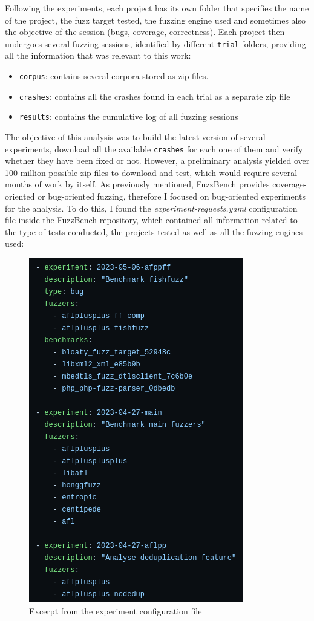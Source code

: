 Following the experiments, each project has its own folder that specifies the name of the project, the fuzz target tested, the fuzzing engine used and sometimes also the objective of the session (bugs, coverage, correctness). Each project then undergoes several fuzzing sessions, identified by different \verb|trial| folders, providing all the information that was relevant to this work:
\begin{itemize}
    \item \verb|corpus|: contains several corpora stored as zip files.
    \item \verb|crashes|: contains all the crashes found in each trial as a separate zip file
    \item \verb|results|: contains the cumulative log of all fuzzing sessions
\end{itemize}


The objective of this analysis was to build the latest version of several experiments, download all the available \verb|crashes| for each one of them and verify whether they have been fixed or not. However, a preliminary analysis yielded over 100 million possible zip files to download and test, which would require several months of work by itself. 
As previously mentioned, FuzzBench provides coverage-oriented or bug-oriented fuzzing, therefore I focused on bug-oriented experiments for the analysis. To do this, I found the \textit{experiment-requests.yaml} configuration file \cite{exp_yaml} inside the FuzzBench repository, which contained all information related to the type of tests conducted, the projects tested as well as all the fuzzing engines used:

\begin{figure}[h]
\centering
\includegraphics[scale=0.58]{foto/exp_yaml.png}
\caption{Excerpt from the experiment configuration file}
\label{fig:exp_yaml}
\end{figure}


